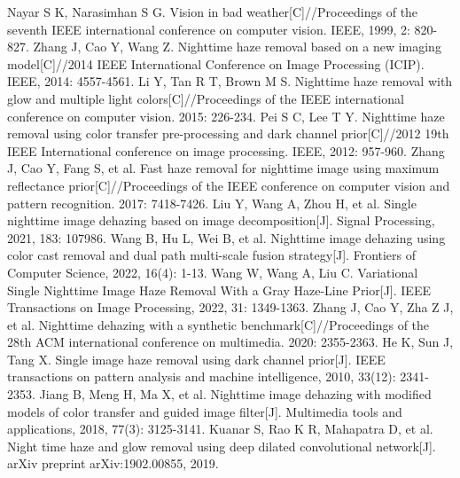 \renewcommand{\baselinestretch}{\yuanbeishu} %
\normalsize{}                         %
\begin{multicols}{2} 
\begin{thebibliography}{9}                   %

Nayar S K, Narasimhan S G. Vision in bad weather[C]//Proceedings of the seventh IEEE international conference on computer vision. IEEE, 1999, 2: 820-827.
	Zhang J, Cao Y, Wang Z. Nighttime haze removal based on a new imaging model[C]//2014 IEEE International Conference on Image Processing (ICIP). IEEE, 2014: 4557-4561.
	Li Y, Tan R T, Brown M S. Nighttime haze removal with glow and multiple light colors[C]//Proceedings of the IEEE international conference on computer vision. 2015: 226-234.
	Pei S C, Lee T Y. Nighttime haze removal using color transfer pre-processing and dark channel prior[C]//2012 19th IEEE International conference on image processing. IEEE, 2012: 957-960.
	Zhang J, Cao Y, Fang S, et al. Fast haze removal for nighttime image using maximum reflectance prior[C]//Proceedings of the IEEE conference on computer vision and pattern recognition. 2017: 7418-7426.
	Liu Y, Wang A, Zhou H, et al. Single nighttime image dehazing based on image decomposition[J]. Signal Processing, 2021, 183: 107986.
	Wang B, Hu L, Wei B, et al. Nighttime image dehazing using color cast removal and dual path multi-scale fusion strategy[J]. Frontiers of Computer Science, 2022, 16(4): 1-13.
	Wang W, Wang A, Liu C. Variational Single Nighttime Image Haze Removal With a Gray Haze-Line Prior[J]. IEEE Transactions on Image Processing, 2022, 31: 1349-1363.
	Zhang J, Cao Y, Zha Z J, et al. Nighttime dehazing with a synthetic benchmark[C]//Proceedings of the 28th ACM international conference on multimedia. 2020: 2355-2363.
	He K, Sun J, Tang X. Single image haze removal using dark channel prior[J]. IEEE transactions on pattern analysis and machine intelligence, 2010, 33(12): 2341-2353.
	Jiang B, Meng H, Ma X, et al. Nighttime image dehazing with modified models of color transfer and guided image filter[J]. Multimedia tools and applications, 2018, 77(3): 3125-3141.
	Kuanar S, Rao K R, Mahapatra D, et al. Night time haze and glow removal using deep dilated convolutional network[J]. arXiv preprint arXiv:1902.00855, 2019.

\end{thebibliography}
\end{multicols}
